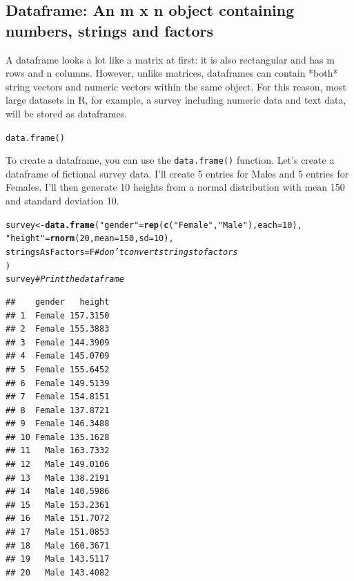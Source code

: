 \documentclass{tufte-book}\usepackage[]{graphicx}\usepackage[]{color}
\makeatletter
\newcommand{\hlnum}[1]{\textcolor[rgb]{0.686,0.059,0.569}{#1}}%
\newcommand{\hlstr}[1]{\textcolor[rgb]{0.192,0.494,0.8}{#1}}%
\newcommand{\hlcom}[1]{\textcolor[rgb]{0.678,0.584,0.686}{\textit{#1}}}%
\newcommand{\hlstd}[1]{\textcolor[rgb]{0.345,0.345,0.345}{#1}}%
\newcommand{\hlkwb}[1]{\textcolor[rgb]{0.69,0.353,0.396}{#1}}%
\newcommand{\hlkwc}[1]{\textcolor[rgb]{0.333,0.667,0.333}{#1}}%
\newcommand{\hlkwd}[1]{\textcolor[rgb]{0.737,0.353,0.396}{\textbf{#1}}}%
\newenvironment{kframe}{%
 \def\at@end@of@kframe{}%
 \ifinner\ifhmode%
  \def\at@end@of@kframe{\end{minipage}}%
  \begin{minipage}{\columnwidth}%
 \fi\fi%
 \def\FrameCommand##1{\hskip\@totalleftmargin \hskip-\fboxsep
 \colorbox{shadecolor}{##1}\hskip-\fboxsep
     \hskip-\linewidth \hskip-\@totalleftmargin \hskip\columnwidth}%
 \MakeFramed {\advance\hsize-\width
   \@totalleftmargin\z@ \linewidth\hsize
   \@setminipage}}%
 {\par\unskip\endMakeFramed%
 \at@end@of@kframe}
\newenvironment{knitrout}{}{} %
\newcommand{\newfun}[1]{\begin{LARGE} \begin{center} \texttt{#1} \end{center} \end{LARGE}}
\makeatother
\begin{document}
\begin{footnotesize}
\subsection{Dataframe: An m x n object containing numbers, strings and factors}

A dataframe looks a lot like a matrix at first: it is also rectangular and has m rows and n columns. However, unlike matrices, dataframes can contain *both* string vectors and numeric vectors within the same object. For this reason, most large datasets in R, for example, a survey including numeric data and text data, will be stored as dataframes.


\newfun{data.frame()}

To create a dataframe, you can use the \texttt{data.frame()} function. Let's create a dataframe of fictional survey data. I'll create 5 entries for Males and 5 entries for Females. I'll then generate 10 heights from a normal distribution with mean 150 and standard deviation 10.

\begin{footnotesize}
\begin{knitrout}
\color{fgcolor}\begin{kframe}
\begin{alltt}
\hlstd{survey} \hlkwb{<-} \hlkwd{data.frame}\hlstd{(}\hlstr{"gender"} \hlstd{=} \hlkwd{rep}\hlstd{(}\hlkwd{c}\hlstd{(}\hlstr{"Female"}\hlstd{,} \hlstr{"Male"}\hlstd{),} \hlkwc{each} \hlstd{=} \hlnum{10}\hlstd{),}
                     \hlstr{"height"} \hlstd{=} \hlkwd{rnorm}\hlstd{(}\hlnum{20}\hlstd{,} \hlkwc{mean} \hlstd{=} \hlnum{150}\hlstd{,} \hlkwc{sd} \hlstd{=} \hlnum{10}\hlstd{),}
                     \hlkwc{stringsAsFactors} \hlstd{= F} \hlcom{# don't convert strings to factors}
                    \hlstd{)}
\hlstd{survey} \hlcom{# Print the dataframe}
\end{alltt}
\begin{verbatim}
##    gender   height
## 1  Female 157.3150
## 2  Female 155.3883
## 3  Female 144.3909
## 4  Female 145.0709
## 5  Female 155.6452
## 6  Female 149.5139
## 7  Female 154.8151
## 8  Female 137.8721
## 9  Female 146.3488
## 10 Female 135.1628
## 11   Male 163.7332
## 12   Male 149.0106
## 13   Male 138.2191
## 14   Male 140.5986
## 15   Male 153.2361
## 16   Male 151.7072
## 17   Male 151.0853
## 18   Male 160.3671
## 19   Male 143.5117
## 20   Male 143.4082
\end{verbatim}
\end{kframe}
\end{knitrout}
\end{footnotesize}


\end{footnotesize}
\end{document}
